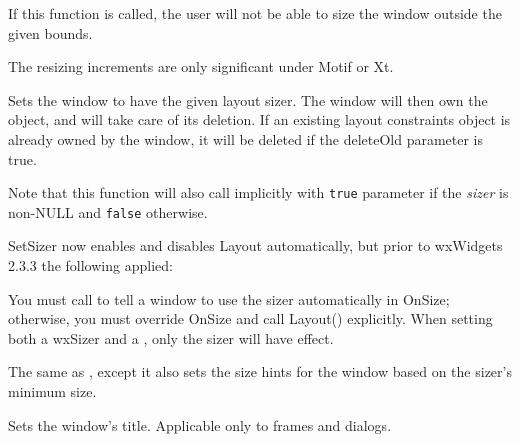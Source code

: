 If this function is called, the user will not be able to size the window outside the
given bounds.

The resizing increments are only significant under Motif or Xt.


\label{wxwindowsetsizer}


Sets the window to have the given layout sizer. The window
will then own the object, and will take care of its deletion.
If an existing layout constraints object is already owned by the
window, it will be deleted if the deleteOld parameter is true.

Note that this function will also call
 implicitly with {\tt true}
parameter if the {\it sizer}\/ is non-NULL and {\tt false} otherwise.





SetSizer now enables and disables Layout automatically, but prior to wxWidgets 2.3.3
the following applied:

You must call  to tell a window to use
the sizer automatically in OnSize; otherwise, you must override OnSize and call Layout()
explicitly. When setting both a wxSizer and a ,
only the sizer will have effect.


\label{wxwindowsetsizerandfit}


The same as , except it also sets the size hints
for the window based on the sizer's minimum size.


\label{wxwindowsettitle}


Sets the window's title. Applicable only to frames and dialogs.

